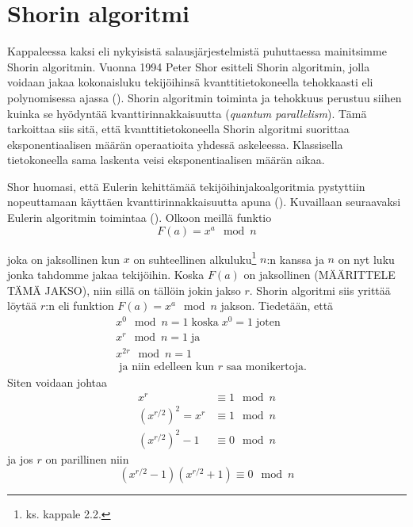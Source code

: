 \section{Shorin algoritmi}
Kappaleessa kaksi eli nykyisistä salausjärjestelmistä puhuttaessa mainitsimme Shorin algoritmin. Vuonna 1994 Peter Shor esitteli Shorin algoritmin, jolla voidaan jakaa kokonaisluku tekijöihinsä kvanttitietokoneella tehokkaasti eli polynomisessa ajassa (\cite{hayward2008quantum}). Shorin algoritmin toiminta ja tehokkuus perustuu siihen kuinka se hyödyntää kvanttirinnakkaisuutta (\emph{quantum parallelism}). Tämä tarkoittaa siis sitä, että kvanttitietokoneella Shorin algoritmi suorittaa eksponentiaalisen määrän operaatioita yhdessä askeleessa. Klassisella tietokoneella sama laskenta veisi eksponentiaalisen määrän aikaa.

Shor huomasi, että Eulerin kehittämää tekijöihinjakoalgoritmia pystyttiin nopeuttamaan käyttäen kvanttirinnakkaisuutta apuna (\cite{doi:10.1080/23742917.2016.1226650}). Kuvaillaan seuraavaksi Eulerin algoritmin toimintaa (\cite{hayward2008quantum}). Olkoon meillä funktio
\begin{equation}
    \label{eq1}
    F(a) = x^{a} \mod n
\end{equation}

joka on jaksollinen kun $x$ on suhteellinen alkuluku\footnote{ks. kappale 2.2.} $n$:n kanssa ja $n$ on nyt luku jonka tahdomme jakaa tekijöihin. Koska $F(a)$ on jaksollinen (MÄÄRITTELE TÄMÄ JAKSO), niin sillä on tällöin jokin jakso $r$. Shorin algoritmi siis yrittää löytää $r$:n eli funktion $F(a) = x^{a} \mod n$ jakson. Tiedetään, että 
\begin{equation}
    \label{eq2}
    \begin{split}
    & x^{0} \mod n = 1 \; \text{koska} \;  x^0 = 1 \; \text{joten} \\
    & x^{r} \mod n = 1 \; \text{ja} \\
    & x^{2r} \mod n = 1 \\
    & \; \text{ja niin edelleen kun $r$ saa monikertoja.}
    \end{split}
\end{equation}
Siten voidaan johtaa
\begin{equation}
    \label{eq3}
    \begin{split}
    x^{r} & \equiv 1 \mod n \\
    (x^{r/2})^{2} = x^{r} & \equiv 1 \mod n \\
    (x^{r/2})^{2} - 1 & \equiv 0 \mod n
    \end{split}
\end{equation}
ja jos $r$ on parillinen niin
\begin{equation}
    \label{eq4}
    (x^{r/2} - 1)(x^{r/2} + 1) \equiv 0 \mod n
\end{equation}

